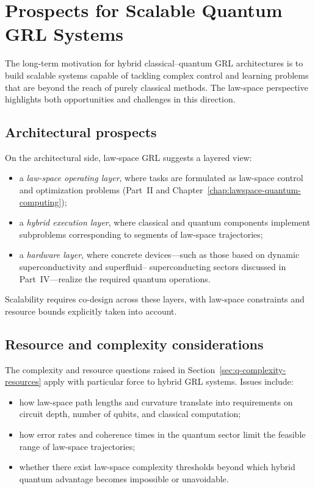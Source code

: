 \documentclass[11pt]{book}
\theoremstyle{plain}
\theoremstyle{definition}
\theoremstyle{remark}
\begin{document}
\section{Prospects for Scalable Quantum GRL Systems}
\label{sec:prospects-scalable-qgrl}


The long-term motivation for hybrid classical–quantum GRL
architectures is to build scalable systems capable of tackling
complex control and learning problems that are beyond the reach of
purely classical methods. The law-space perspective highlights both
opportunities and challenges in this direction.

\subsection*{Architectural prospects}

On the architectural side, law-space GRL suggests a layered view:

\begin{itemize}
  \item a \emph{law-space operating layer}, where tasks are
        formulated as law-space control and optimization problems
        (Part~II and Chapter~\ref{chap:lawspace-quantum-computing});
  \item a \emph{hybrid execution layer}, where classical and quantum
        components implement subproblems corresponding to segments
        of law-space trajectories;
  \item a \emph{hardware layer}, where concrete devices—such as
        those based on dynamic superconductivity and superfluid–
        superconducting sectors discussed in Part~IV—realize the
        required quantum operations.
\end{itemize}

Scalability requires co-design across these layers, with law-space
constraints and resource bounds explicitly taken into account.

\subsection*{Resource and complexity considerations}

The complexity and resource questions raised in
Section~\ref{sec:q-complexity-resources} apply with particular force
to hybrid GRL systems. Issues include:
\begin{itemize}
  \item how law-space path lengths and curvature translate into
        requirements on circuit depth, number of qubits, and
        classical computation;
  \item how error rates and coherence times in the quantum sector
        limit the feasible range of law-space trajectories;
  \item whether there exist law-space complexity thresholds beyond
        which hybrid quantum advantage becomes impossible or
        unavoidable.
\end{itemize}
\end{document}
